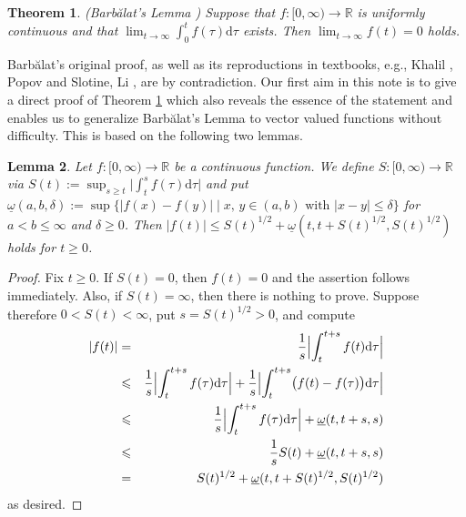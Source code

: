 \documentclass[10pt, a4paper, reqno]{amsart}
\theoremstyle{normal}
\newtheorem{thm}{Theorem}
\newtheorem{lem}[thm]{Lemma}
\newcommand{\dd}{\mathrm{d}}
\newcommand{\omegapr}{\underline{\omega}}
\begin{document}
\smallskip

\begin{thm}\label{THM-1}(Barb\u{a}lat's Lemma \cite[p.~269]{Barbalat}) Suppose that $f\colon[0,\infty)\rightarrow\mathbb{R}$ is uniformly continuous and that $\lim_{t\rightarrow\infty}\int_0^tf(\tau)\dd\tau$ exists. Then $\lim_{t\rightarrow\infty}f(t)=0$ holds.
\end{thm}

\smallskip

Barb\u{a}lat's original proof, as well as its reproductions in textbooks, e.g., Khalil \cite[p.~192]{K}, Popov \cite[p.~211]{Popov} and Slotine, Li \cite[p.~124]{SL}, are by contradiction. Our first aim in this note is to give a direct proof of Theorem \ref{THM-1} which also reveals the essence of the statement and enables us to generalize Barb\u{a}lat's Lemma to vector valued functions without difficulty. This is based on the following two lemmas.

\smallskip


\begin{lem}\label{LEM-1} Let $f:[0,\infty)\to\mathbb{R}$ be a continuous function. We define $S\colon[0,\infty)\rightarrow\mathbb{R}$ via $S(t):=\sup_{s\geqslant{}t}\bigl|\int_t^sf(\tau)\dd\tau\bigr|$ and put $\omegapr(a,b,\delta):=\sup\{|f(x)-f(y)|\; | \; x,\,y\in (a,b) \text{ with } |x-y|\leqslant \delta\}$ for $a<b\leqslant\infty$ and $\delta\geqslant 0$. Then $|f(t)|\leqslant S(t)^{1/2}+\omegapr(t,t+S(t)^{1/2},S(t)^{1/2})$ holds for $t\geqslant 0$.
\end{lem}

\smallskip

\begin{proof} Fix $t\geqslant0$. If $S(t)=0$, then $f(t)=0$ and the assertion follows immediately. Also, if $S(t)=\infty$, then there is nothing to prove. Suppose therefore $0<S(t)<\infty$, put $s=S(t)^{1/2}>0$, and compute
\begin{eqnarray*}
|f(t)|&=&\frac 1s\Bigl|\int_t^{t+s} f(t) \dd\tau\Bigr|\\
&\leqslant& \frac 1s\Bigl|\int_t^{t+s} f(\tau) \dd\tau\Bigr|+\frac 1s\Bigl|\int_t^{t+s} \bigl(f(t) -f(\tau)\bigr)\dd\tau\Bigr|\\
&\leqslant& \frac 1s\Bigl|\int_t^{t+s} f(\tau) \dd\tau\Bigr|+\omegapr(t,t+s,s)\\
&\leqslant& \frac 1s S(t)+{\omegapr}(t,t+s,s) \\
&=& \; S(t)^{1/2}+\omegapr(t,t+S(t)^{1/2},S(t)^{1/2})
\end{eqnarray*}
as desired.
\end{proof}
\end{document}
